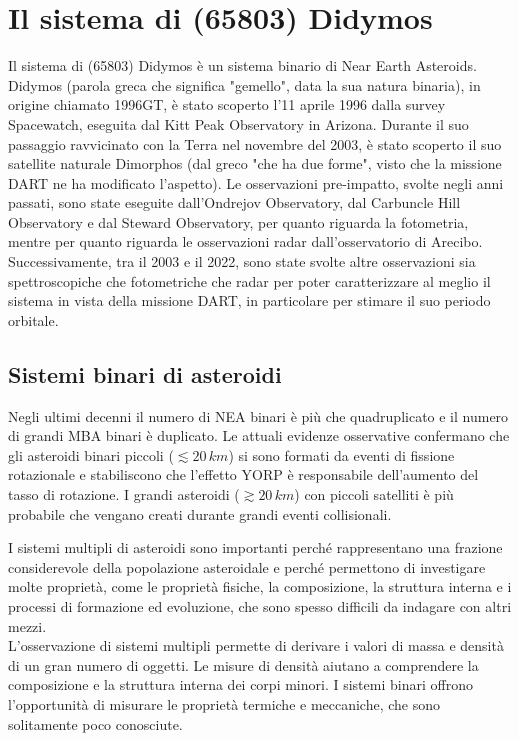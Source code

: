 \chapter{Il sistema di (65803) Didymos}\label{ch:ch_4}
Il sistema di (65803) Didymos è un sistema binario di Near Earth Asteroids.\\
Didymos (parola greca che significa "gemello", data la sua natura binaria), in origine chiamato 1996GT, è stato scoperto l'11 aprile 1996 dalla survey Spacewatch, eseguita dal Kitt Peak Observatory in Arizona. Durante il suo passaggio ravvicinato con la Terra nel novembre del 2003, è stato scoperto il suo satellite naturale Dimorphos (dal greco "che ha due forme", visto che la missione DART ne ha modificato l'aspetto). Le osservazioni pre-impatto, svolte negli anni passati, sono state eseguite dall'Ondrejov Observatory, dal Carbuncle Hill Observatory e dal Steward Observatory, per quanto riguarda la fotometria, mentre per quanto riguarda le osservazioni radar dall'osservatorio di Arecibo.\\
Successivamente, tra il 2003 e il 2022, sono state svolte altre osservazioni sia spettroscopiche che fotometriche che radar per poter caratterizzare al meglio il sistema in vista della missione DART, in particolare per stimare il suo periodo orbitale.

\section{Sistemi binari di asteroidi}\label{sec:binary_system}
Negli ultimi decenni il numero di NEA binari è più che quadruplicato e il numero di grandi MBA binari è duplicato. Le attuali evidenze osservative confermano che gli asteroidi binari piccoli ($\lesssim 20\,km$) si sono formati da eventi di fissione rotazionale e stabiliscono che l'effetto YORP è responsabile dell'aumento del tasso di rotazione. I grandi asteroidi ($\gtrsim20\,km$) con piccoli satelliti è più probabile che vengano creati durante grandi eventi collisionali.

I sistemi multipli di asteroidi sono importanti perché rappresentano una frazione considerevole della popolazione asteroidale e perché permettono di investigare molte proprietà, come le proprietà fisiche, la composizione, la struttura interna e i processi di formazione ed evoluzione, che sono spesso difficili da indagare con altri mezzi.\\
L'osservazione di sistemi multipli permette di derivare i valori di massa e densità di un gran numero di oggetti. Le misure di densità aiutano a comprendere la composizione e la struttura interna dei corpi minori. I sistemi binari offrono l'opportunità di misurare le proprietà termiche e meccaniche, che sono solitamente poco conosciute.

